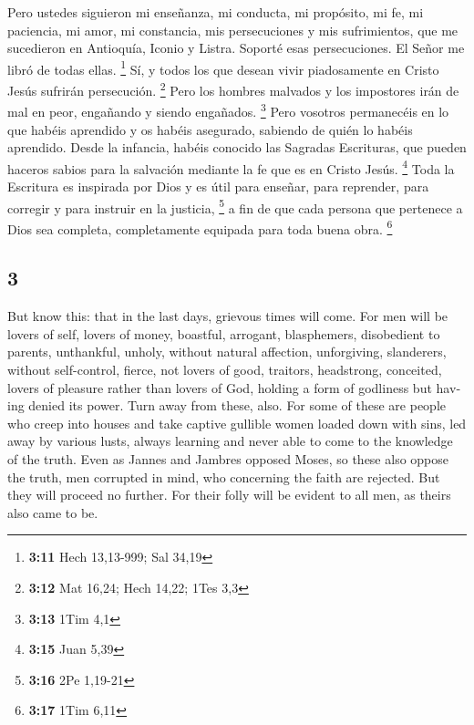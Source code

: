 \begin{paracol}{2}
 Pero ustedes siguieron mi enseñanza, mi conducta, mi
propósito, mi fe, mi paciencia, mi amor, mi constancia, 
mis persecuciones y mis sufrimientos, que me sucedieron en Antioquía,
Iconio y Listra. Soporté esas persecuciones. El Señor me libró de todas
ellas. \footnote{\textbf{3:11} Hech 13,13-999; Sal 34,19}
 Sí, y todos los que desean vivir piadosamente en Cristo
Jesús sufrirán persecución. \footnote{\textbf{3:12} Mat 16,24; Hech
  14,22; 1Tes 3,3}  Pero los hombres malvados y los
impostores irán de mal en peor, engañando y siendo engañados.
\footnote{\textbf{3:13} 1Tim 4,1}  Pero vosotros
permanecéis en lo que habéis aprendido y os habéis asegurado, sabiendo
de quién lo habéis aprendido.  Desde la infancia, habéis
conocido las Sagradas Escrituras, que pueden haceros sabios para la
salvación mediante la fe que es en Cristo Jesús. \footnote{\textbf{3:15}
  Juan 5,39}  Toda la Escritura es inspirada por Dios y
es útil para enseñar, para reprender, para corregir y para instruir en
la justicia, \footnote{\textbf{3:16} 2Pe 1,19-21}  a fin
de que cada persona que pertenece a Dios sea completa, completamente
equipada para toda buena obra. \footnote{\textbf{3:17} 1Tim 6,11}

\switchcolumn
\begin{otherlanguage}{english}

\hypertarget{section-5}{%
\section{3}\label{section-5}}

 But know this: that in the last days, grievous times will
come.  For men will be lovers of self, lovers of money,
boastful, arrogant, blasphemers, disobedient to parents, unthankful,
unholy,  without natural affection, unforgiving,
slanderers, without self-control, fierce, not lovers of good,
 traitors, headstrong, conceited, lovers of pleasure
rather than lovers of God,  holding a form of godliness
but having denied its power. Turn away from these, also. 
For some of these are people who creep into houses and take captive
gullible women loaded down with sins, led away by various lusts,
 always learning and never able to come to the knowledge
of the truth.  Even as Jannes and Jambres opposed Moses,
so these also oppose the truth, men corrupted in mind, who concerning
the faith are rejected.  But they will proceed no further.
For their folly will be evident to all men, as theirs also came to be.


\end{otherlanguage}
\end{paracol}

